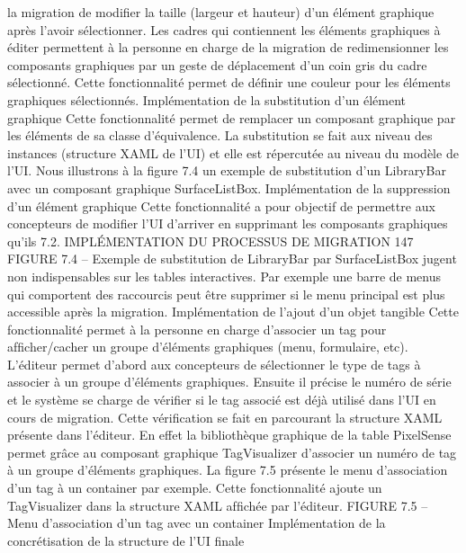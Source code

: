 \documentclass{article}
\begin{document}
la migration de modiﬁer la taille (largeur et hauteur) d’un \'{e}l\'{e}ment graphique apr\`{e}s l’avoir s\'{e}lectionner.
Les cadres qui contiennent les \'{e}l\'{e}ments graphiques \`{a} \'{e}diter permettent \`{a} la personne en charge de la
migration de redimensionner les composants graphiques par un geste de d\'{e}placement d’un coin gris
du cadre s\'{e}lectionn\'{e}. Cette fonctionnalit\'{e} permet de d\'{e}ﬁnir une couleur pour les \'{e}l\'{e}ments graphiques
s\'{e}lectionn\'{e}s.
Impl\'{e}mentation de la substitution d’un \'{e}l\'{e}ment graphique
Cette fonctionnalit\'{e} permet de remplacer un composant graphique par les \'{e}l\'{e}ments de sa classe d’\'{e}quivalence. La substitution se fait
aux niveau des instances (structure XAML de l’UI) et elle est r\'{e}percut\'{e}e au niveau du mod\`{e}le de
l’UI. Nous illustrons \`{a} la ﬁgure 7.4 un exemple de substitution d’un LibraryBar avec un composant
graphique SurfaceListBox.
Impl\'{e}mentation de la suppression d’un \'{e}l\'{e}ment graphique
Cette fonctionnalit\'{e} a pour objectif de
permettre aux concepteurs de modiﬁer l’UI d’arriver en supprimant les composants graphiques qu’ils
7.2. IMPLÉMENTATION DU PROCESSUS DE MIGRATION
147
FIGURE 7.4 – Exemple de substitution de LibraryBar par SurfaceListBox
jugent non indispensables sur les tables interactives. Par exemple une barre de menus qui comportent
des raccourcis peut \^{e}tre supprimer si le menu principal est plus accessible apr\`{e}s la migration.
Impl\'{e}mentation de l’ajout d’un objet tangible
Cette fonctionnalit\'{e} permet \`{a} la personne en charge
d’associer un tag pour afﬁcher/cacher un groupe d’\'{e}l\'{e}ments graphiques (menu, formulaire, etc). L’\'{e}diteur permet d’abord aux concepteurs de s\'{e}lectionner le type de tags \`{a} associer \`{a} un groupe d’\'{e}l\'{e}ments
graphiques. Ensuite il pr\'{e}cise le num\'{e}ro de s\'{e}rie et le syst\`{e}me se charge de v\'{e}riﬁer si le tag associ\'{e} est
d\'{e}j\`{a} utilis\'{e} dans l’UI en cours de migration. Cette v\'{e}riﬁcation se fait en parcourant la structure XAML
pr\'{e}sente dans l’\'{e}diteur. En effet la biblioth\`{e}que graphique de la table PixelSense permet gr\^{a}ce au composant graphique TagVisualizer d’associer un num\'{e}ro de tag \`{a} un groupe d’\'{e}l\'{e}ments graphiques. La
ﬁgure 7.5 pr\'{e}sente le menu d’association d’un tag \`{a} un container par exemple. Cette fonctionnalit\'{e}
ajoute un TagVisualizer dans la structure XAML afﬁch\'{e}e par l’\'{e}diteur.
FIGURE 7.5 – Menu d’association d’un tag avec un container
Impl\'{e}mentation de la concr\'{e}tisation de la structure de l’UI ﬁnale
\end{document}
